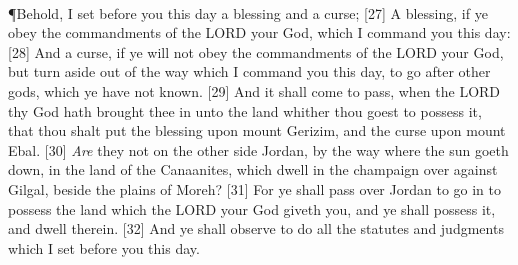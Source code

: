 \\
\P \textcolor[cmyk]{0.99998,1,0,0}{Behold, I set before you this day a blessing and a curse;}
[27] \textcolor[cmyk]{0.99998,1,0,0}{A blessing, if ye obey the commandments of the LORD your God, which I command you this day:}
[28] \textcolor[cmyk]{0.99998,1,0,0}{And a curse, if ye will not obey the commandments of the LORD your God, but turn aside out of the way which I command you this day, to go after other gods, which ye have not known.}
[29] \textcolor[cmyk]{0.99998,1,0,0}{And it shall come to pass, when the LORD thy God hath brought thee in unto the land whither thou goest to possess it, that thou shalt put the blessing upon mount Gerizim, and the curse upon mount Ebal.}
[30] \textcolor[cmyk]{0.99998,1,0,0}{\emph{Are} they not on the other side Jordan, by the way where the sun goeth down, in the land of the Canaanites, which dwell in the champaign over against Gilgal, beside the plains of Moreh?}
[31] \textcolor[cmyk]{0.99998,1,0,0}{For ye shall pass over Jordan to go in to possess the land which the LORD your God giveth you, and ye shall possess it, and dwell therein.}
[32] \textcolor[cmyk]{0.99998,1,0,0}{And ye shall observe to do all the statutes and judgments which I set before you this day.}